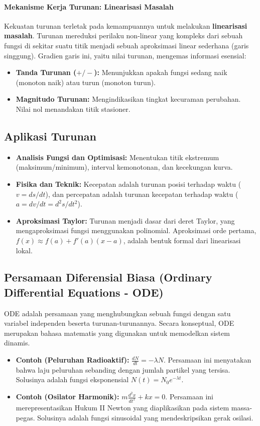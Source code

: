 \documentclass[12pt, a4paper]{article}
\begin{document}
\paragraph{Mekanisme Kerja Turunan: Linearisasi Masalah}
Kekuatan turunan terletak pada kemampuannya untuk melakukan \textbf{linearisasi masalah}. Turunan mereduksi perilaku non-linear yang kompleks dari sebuah fungsi di sekitar suatu titik menjadi sebuah aproksimasi linear sederhana (garis singgung). Gradien garis ini, yaitu nilai turunan, mengemas informasi esensial:
\begin{itemize}
    \item \textbf{Tanda Turunan ($+/-$):} Menunjukkan apakah fungsi sedang naik (monoton naik) atau turun (monoton turun).
    \item \textbf{Magnitudo Turunan:} Mengindikasikan tingkat kecuraman perubahan. Nilai nol menandakan titik stasioner.
\end{itemize}

\subsection{Aplikasi Turunan}
\begin{itemize}
    \item \textbf{Analisis Fungsi dan Optimisasi:} Menentukan titik ekstremum (maksimum/minimum), interval kemonotonan, dan kecekungan kurva.
    \item \textbf{Fisika dan Teknik:} Kecepatan adalah turunan posisi terhadap waktu ($v = ds/dt$), dan percepatan adalah turunan kecepatan terhadap waktu ($a = dv/dt = d^2s/dt^2$).
    \item \textbf{Aproksimasi Taylor:} Turunan menjadi dasar dari deret Taylor, yang mengaproksimasi fungsi menggunakan polinomial. Aproksimasi orde pertama, $f(x) \approx f(a) + f'(a)(x-a)$, adalah bentuk formal dari linearisasi lokal.
\end{itemize}

\subsection{Persamaan Diferensial Biasa (Ordinary Differential Equations - ODE)}
ODE adalah persamaan yang menghubungkan sebuah fungsi dengan satu variabel independen beserta turunan-turunannya. Secara konseptual, ODE merupakan bahasa matematis yang digunakan untuk memodelkan sistem dinamis.
\begin{itemize}
    \item \textbf{Contoh (Peluruhan Radioaktif):} $\frac{dN}{dt} = -\lambda N$. Persamaan ini menyatakan bahwa laju peluruhan sebanding dengan jumlah partikel yang tersisa. Solusinya adalah fungsi eksponensial $N(t) = N_0 e^{-\lambda t}$.
    \item \textbf{Contoh (Osilator Harmonik):} $m\frac{d^2x}{dt^2} + kx = 0$. Persamaan ini merepresentasikan Hukum II Newton yang diaplikasikan pada sistem massa-pegas. Solusinya adalah fungsi sinusoidal yang mendeskripsikan gerak osilasi.
\end{itemize}
\end{document}
